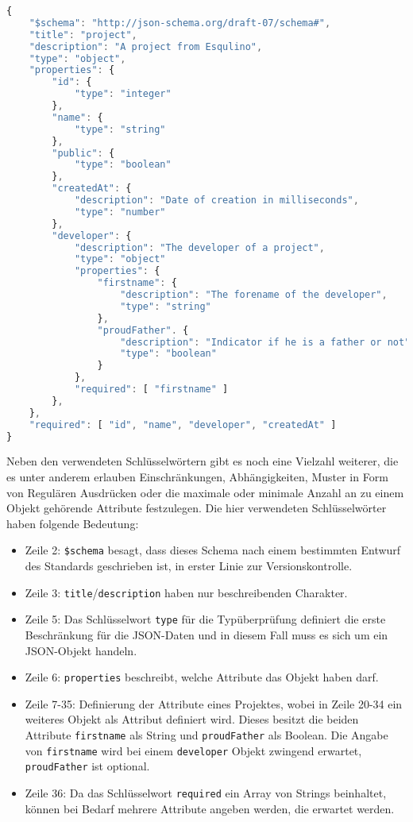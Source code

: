\begin{lstlisting}[language=Javascript,float=h!,caption={JSON Schema zu Projekt Objekt}, label={fig:basics:jsonschema:2}]
{
    "$schema": "http://json-schema.org/draft-07/schema#",
    "title": "project",
    "description": "A project from Esqulino",
    "type": "object",
    "properties": {
        "id": {
            "type": "integer"
        },
        "name": {
            "type": "string"
        },
        "public": {
            "type": "boolean"
        },
        "createdAt": {
            "description": "Date of creation in milliseconds",
            "type": "number"
        },
        "developer": {
            "description": "The developer of a project",
            "type": "object"
            "properties": {
                "firstname": {
                    "description": "The forename of the developer",
                    "type": "string"
                },
                "proudFather". {
                    "description": "Indicator if he is a father or not",
                    "type": "boolean"
                }
            },
            "required": [ "firstname" ]
        },
    },
    "required": [ "id", "name", "developer", "createdAt" ]
}
\end{lstlisting}

Neben den verwendeten Schlüsselwörtern gibt es noch eine Vielzahl weiterer, die es unter anderem erlauben Einschränkungen, Abhängigkeiten,
Muster in Form von Regulären Ausdrücken oder die maximale oder minimale Anzahl an zu einem Objekt gehörende Attribute festzulegen.
Die hier verwendeten Schlüsselwörter haben folgende Bedeutung:

\begin{itemize}
    \label{basics:jsonschema:items}
    \setlength\itemsep{-1em}
    \item Zeile 2: \texttt{\$schema} besagt, dass dieses Schema nach einem bestimmten Entwurf des Standards geschrieben ist, in erster Linie zur Versionskontrolle.
    \item Zeile 3: \texttt{title}/\texttt{description} haben nur beschreibenden Charakter.
    \item Zeile 5: Das Schlüsselwort \texttt{type} für die Typüberprüfung definiert die erste Beschränkung für die JSON-Daten und in diesem Fall muss es sich um ein JSON-Objekt handeln.
    \item Zeile 6: \texttt{properties} beschreibt, welche Attribute das Objekt haben darf.
    \item Zeile 7-35: Definierung der Attribute eines Projektes, wobei in Zeile 20-34 ein weiteres Objekt als Attribut definiert wird. Dieses besitzt die beiden Attribute \texttt{firstname} als String und \texttt{proudFather} als Boolean. Die Angabe von \texttt{firstname} wird bei einem \texttt{developer} Objekt zwingend erwartet, \texttt{proudFather} ist optional.
    \item Zeile 36: Da das Schlüsselwort \texttt{required}  ein Array von Strings beinhaltet, können bei Bedarf mehrere Attribute angeben werden, die erwartet werden.
\end{itemize}

